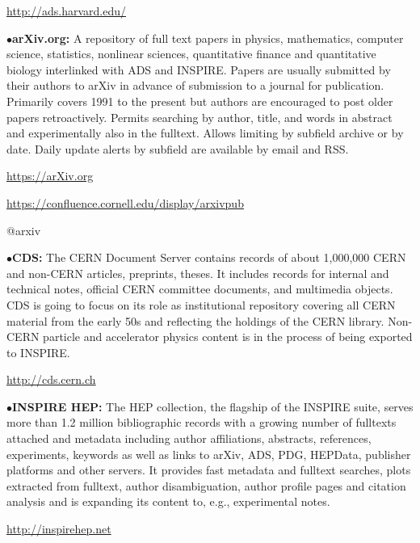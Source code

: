        \item{}\qquad\url{http://ads.harvard.edu/}

\medskip

\item{$\bullet$}{\bf arXiv.org:}
A repository of full text papers in physics, mathematics, computer science, statistics, nonlinear sciences, quantitative finance and quantitative biology interlinked with ADS and INSPIRE. Papers are usually submitted by their authors to arXiv in advance of submission to a journal for publication. Primarily covers 1991 to the present but authors are encouraged to post older papers retroactively. Permits searching by author, title, and words in abstract and experimentally also in the fulltext. Allows limiting by subfield archive or by date. Daily update alerts by subfield are available by email and RSS.

	\item{}\qquad\url{https://arXiv.org}
	\item{} \url{https://confluence.cornell.edu/display/arxivpub}
	\item{} @arxiv
\medskip

\item{$\bullet$}{\bf CDS:}
The CERN Document Server contains records of about 1,000,000 CERN and non-CERN articles, preprints, theses. It includes records for internal and technical notes, official CERN committee documents, and multimedia objects. CDS is going to focus on its role as institutional repository covering all CERN material from the early 50s and reflecting the holdings of the CERN library. Non-CERN particle and accelerator physics content is in the process of being exported to INSPIRE.

      \item{}\qquad\url{http://cds.cern.ch}
\medskip

\item{$\bullet$}{\bf INSPIRE HEP:}
The HEP collection, the flagship of the INSPIRE suite, serves more than 1.2 million bibliographic records with a growing number of fulltexts attached and metadata including author affiliations, abstracts, references, experiments, keywords as well as links to arXiv, ADS, PDG, HEPData, publisher platforms and other servers. It provides fast metadata and fulltext searches, plots extracted from fulltext, author disambiguation, author profile pages and citation analysis and is expanding its content to, e.g., experimental notes.

   \item{}\qquad\url{http://inspirehep.net}
\medskip


